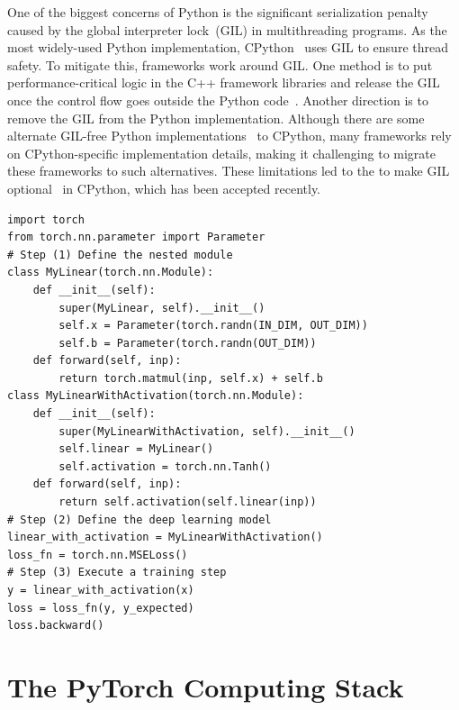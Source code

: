 One of the biggest concerns of Python is the significant serialization penalty caused by the global interpreter lock~(GIL) in multithreading programs. As the most widely-used Python implementation, CPython~\cite{wikipediaCPython2008} uses GIL to ensure thread safety. To mitigate this, frameworks work around GIL. One method is to put performance-critical logic in the C++ framework libraries and release the GIL once the control flow goes outside the Python code~\cite{CanPytorchBypass2019}. Another direction is to remove the GIL from the Python implementation. Although there are some alternate GIL-free Python implementations~\cite{wikipediaIronPython2006} to CPython, many frameworks rely on CPython-specific implementation details, making it challenging to migrate these frameworks to such alternatives. These limitations led to the  to make GIL optional~\cite{samgrossPEP703Making2023} in CPython, which has been accepted recently.


\begin{lstlisting}[float,caption={PyTorch code to define model in Figure~\ref{fig:pytorch_graph} and perform a training step. We denote the input hidden dimension as \texttt{IN\_DIM} and the output hidden dimension as \texttt{OUT\_DIM}.},label={lst:pytorch_nested_module}]
import torch
from torch.nn.parameter import Parameter
# Step (1) Define the nested module
class MyLinear(torch.nn.Module):
    def __init__(self):
        super(MyLinear, self).__init__()
        self.x = Parameter(torch.randn(IN_DIM, OUT_DIM))
        self.b = Parameter(torch.randn(OUT_DIM))
    def forward(self, inp):
        return torch.matmul(inp, self.x) + self.b
class MyLinearWithActivation(torch.nn.Module):
    def __init__(self):
        super(MyLinearWithActivation, self).__init__()
        self.linear = MyLinear()
        self.activation = torch.nn.Tanh()
    def forward(self, inp):
        return self.activation(self.linear(inp))
# Step (2) Define the deep learning model
linear_with_activation = MyLinearWithActivation()
loss_fn = torch.nn.MSELoss()
# Step (3) Execute a training step
y = linear_with_activation(x)
loss = loss_fn(y, y_expected)
loss.backward()
\end{lstlisting}

\section{The PyTorch Computing Stack}
\label{sec:bg_pytorch}

